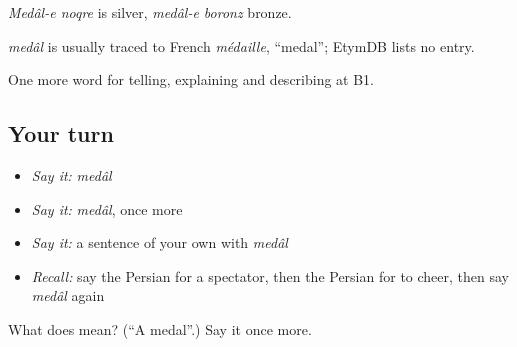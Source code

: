 \emph{Medâl-e noqre} is silver, \emph{medâl-e boronz} bronze.

\begin{cousinweb}
\emph{medâl} is usually traced to French \emph{médaille}, \textquotedblleft{}medal\textquotedblright{}; EtymDB lists no entry.
\end{cousinweb}

\begin{grammarlens}[title={What you've built}]
One more word for telling, explaining and describing at B1.
\end{grammarlens}

\subsection*{Your turn}
\begin{itemize}
\raggedright
  \item \emph{Say it:} \emph{medâl}
  \item \emph{Say it:} \emph{medâl}, once more
  \item \emph{Say it:} a sentence of your own with \emph{medâl}
  \item \emph{Recall:} say the Persian for a spectator, then the Persian for to cheer, then say \emph{medâl} again
\end{itemize}

\begin{tcolorbox}[breakable,colback=teal!4,colframe=teal!35!black,title={Before you move on}]
What does  mean? (\textquotedblleft{}A medal\textquotedblright{}.) Say it once more.
\end{tcolorbox}
